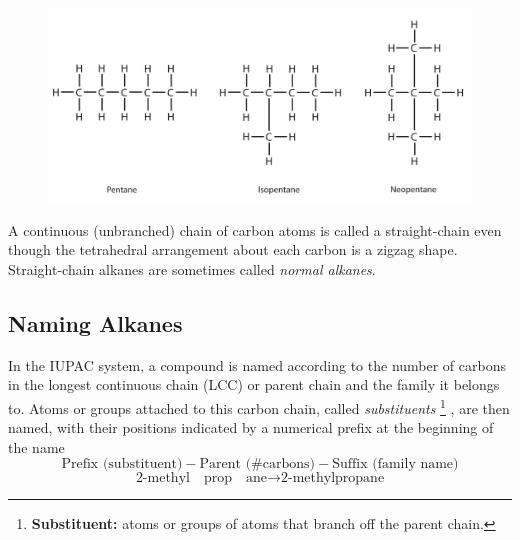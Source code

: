 \begin{figure}[ht!]
    \centering
    \includegraphics[width=0.8 \textwidth]{../figures/pentane-isopentane-neopentane.png}
\end{figure}

\begin{important}
    A continuous (unbranched) chain of carbon atoms is called a straight-chain even though the
    tetrahedral arrangement about each carbon is a zigzag shape. Straight-chain alkanes are sometimes
    called \textit{normal alkanes}.
\end{important}

\subsection{Naming Alkanes}
In the IUPAC system, a compound is named according to the number of carbons in the longest continuous
chain (LCC) or parent chain and the family it belongs to. Atoms or groups attached to this carbon
chain, called \textit{substituents}
\footnote{
    \textbf{Substituent:} atoms or groups of atoms that branch off the parent chain.
}
, are then named, with their positions indicated by a numerical
prefix at the beginning of the name
\[
    \text{Prefix (substituent)}-\text{Parent (\# carbons)}-\text{Suffix (family name)}
\]
\[
    \text{2-methyl}\quad\text{prop}\quad\text{ane}\to \text{2-methylpropane}
\]

